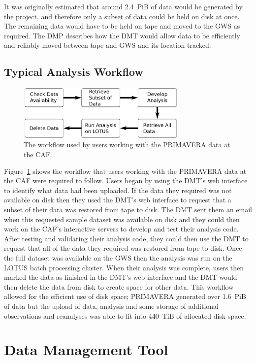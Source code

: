 \documentclass[gmd, manuscript]{copernicus}
\begin{document}
It was originally estimated that around 2.4~PiB of data would be generated by the project, and therefore only a subset of data could be held on disk at once. The remaining data would have to be held on tape and moved to the GWS as required. The DMP describes how the DMT would allow data to be efficiently and reliably moved between tape and GWS and its location tracked.

\subsection{Typical Analysis Workflow}

\begin{figure}[ht]
	\includegraphics[width=8.3cm]{fig02.pdf}
	\caption{The workflow used by users working with the PRIMAVERA data at the CAF.}
	\label{analysis_workflow}
\end{figure}

Figure~\ref{analysis_workflow} shows the workflow that users working with the PRIMAVERA data at the CAF were required to follow. Users began by using the DMT's web interface to identify what data had been uploaded. If the data they required was not available on disk then they used the DMT's web interface to request that a subset of their data was restored from tape to disk. The DMT sent them an email when this requested sample dataset was available on disk and they could then work on the CAF's interactive servers to develop and test their analysis code. After testing and validating their analysis code, they could then use the DMT to request that all of the data they required was restored from tape to disk. Once the full dataset was available on the GWS then the analysis was run on the LOTUS batch processing cluster. When their analysis was complete, users then marked the data as finished in the DMT's web interface and the DMT would then delete the data from disk to create space for other data. This workflow allowed for the efficient use of disk space; PRIMAVERA generated over 1.6~PiB of data but the upload of data, analysis and some storage of additional observations and reanalyses was able to fit into 440~TiB of allocated disk space.

\section{Data Management Tool}
\end{document}
